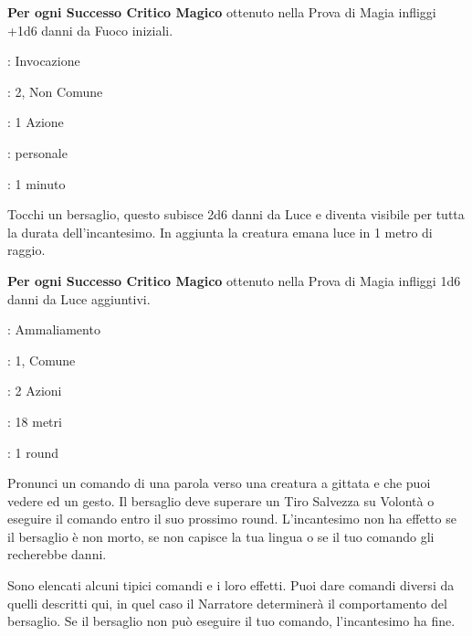 \begin{multicols}{2}
\textbf{Per ogni Successo Critico Magico} ottenuto nella Prova di Magia infliggi +1d6 danni da Fuoco iniziali.

\noindent\colorbox{OBSSgold!10}{
\begin{minipage}{0.95\linewidth}
\begin{description}[noitemsep, topsep=0pt, parsep=0pt, partopsep=0pt, leftmargin=0cm, labelwidth=1.3cm]
	\item[\textbf{Lista}]: Invocazione
	\item[\textbf{Livello}]: 2, Non Comune
	\item[\textbf{Lancio}]: 1 Azione
	\item[\textbf{Gittata}]: personale
	\item[\textbf{Durata}]: 1 minuto
\end{description}
\end{minipage}}\smallskip

Tocchi un bersaglio, questo subisce 2d6 danni da Luce e diventa visibile per tutta la durata dell'incantesimo. In aggiunta la creatura emana luce in 1 metro di raggio.

\textbf{Per ogni Successo Critico Magico} ottenuto nella Prova di Magia infliggi 1d6 danni da Luce aggiuntivi.

\noindent\colorbox{OBSSgold!10}{
\begin{minipage}{0.95\linewidth}
\begin{description}[noitemsep, topsep=0pt, parsep=0pt, partopsep=0pt, leftmargin=0cm, labelwidth=1.3cm]
	\item[\textbf{Lista}]: Ammaliamento
	\item[\textbf{Livello}]: 1, Comune
	\item[\textbf{Lancio}]: 2 Azioni
	\item[\textbf{Gittata}]: 18 metri
	\item[\textbf{Durata}]: 1 round
\end{description}
\end{minipage}}\smallskip

Pronunci un comando di una parola verso una creatura a gittata e che puoi vedere ed un gesto. Il bersaglio deve superare un Tiro Salvezza su Volontà o eseguire il comando entro il suo prossimo round. L'incantesimo non ha effetto se il bersaglio è non morto, se non capisce la tua lingua o se il tuo comando gli recherebbe danni.

Sono elencati alcuni tipici comandi e i loro effetti. Puoi dare comandi diversi da quelli descritti qui, in quel caso il Narratore determinerà il comportamento del bersaglio. Se il bersaglio non può eseguire il tuo comando, l'incantesimo ha fine.


\end{multicols}
